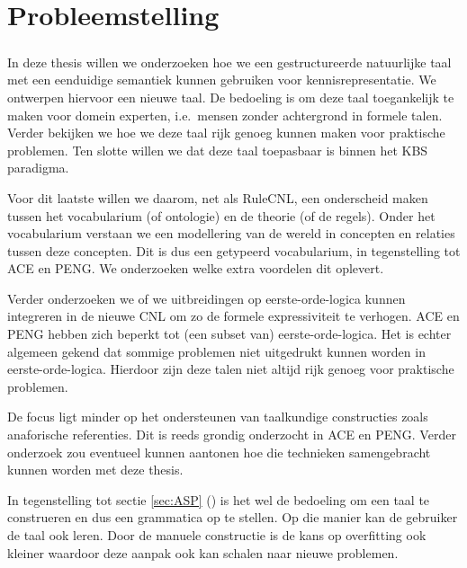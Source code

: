 \chapter{Probleemstelling}
\paragraph{} In deze thesis willen we onderzoeken hoe we een gestructureerde natuurlijke taal met een eenduidige semantiek kunnen gebruiken voor kennisrepresentatie. We ontwerpen hiervoor een nieuwe taal. De bedoeling is om deze taal toegankelijk te maken voor domein experten, i.e.\ mensen zonder achtergrond in formele talen. Verder bekijken we hoe we deze taal rijk genoeg kunnen maken voor praktische problemen. Ten slotte willen we dat deze taal toepasbaar is binnen het KBS paradigma.

Voor dit laatste willen we daarom, net als RuleCNL, een onderscheid maken tussen het vocabularium (of ontologie) en de theorie (of de regels). Onder het vocabularium verstaan we een modellering van de wereld in concepten en relaties tussen deze concepten. Dit is dus een getypeerd vocabularium, in tegenstelling tot ACE en PENG. We onderzoeken welke extra voordelen dit oplevert. 

Verder onderzoeken we of we uitbreidingen op eerste-orde-logica kunnen integreren in de nieuwe CNL om zo de formele expressiviteit te verhogen. ACE en PENG hebben zich beperkt tot (een subset van) eerste-orde-logica. Het is echter algemeen gekend dat sommige problemen niet uitgedrukt kunnen worden in eerste-orde-logica. Hierdoor zijn deze talen niet altijd rijk genoeg voor praktische problemen.

De focus ligt minder op het ondersteunen van taalkundige constructies zoals anaforische referenties. Dit is reeds grondig onderzocht in ACE en PENG. Verder onderzoek zou eventueel kunnen aantonen hoe die technieken samengebracht kunnen worden met deze thesis.

In tegenstelling tot sectie \ref{sec:ASP} () is het wel de bedoeling om een taal te construeren en dus een grammatica op te stellen. Op die manier kan de gebruiker de taal ook leren. Door de manuele constructie is de kans op overfitting ook kleiner waardoor deze aanpak ook kan schalen naar nieuwe problemen.
